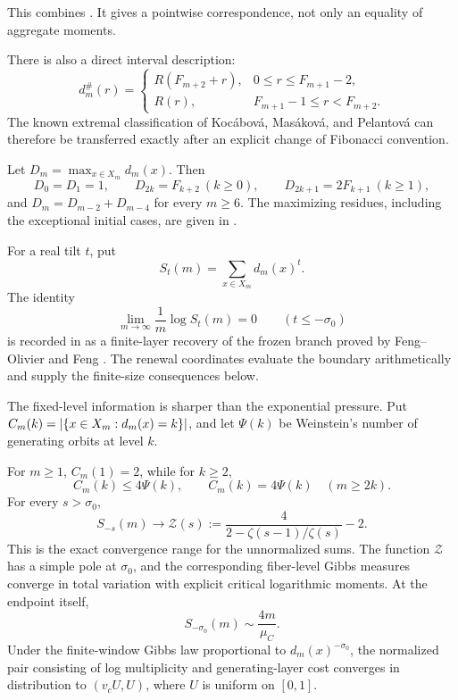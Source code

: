 This combines .  It gives a
pointwise correspondence, not only an equality of aggregate moments.

There is also a direct interval description:
\[
 d_m^\#(r)=
 \begin{cases}
 R(F_{m+2}+r),&0\le r\le F_{m+1}-2,\\
 R(r),&F_{m+1}-1\le r<F_{m+2}.
 \end{cases}
\]
The known extremal classification of Koc\'abov\'a, Mas\'akov\'a, and
Pelantov\'a can therefore be transferred exactly after an explicit change of
Fibonacci convention.

\begin{theoremD}
Let \(D_m=\max_{x\in X_m}d_m(x)\).  Then
\[
 D_0=D_1=1,\qquad D_{2k}=F_{k+2}\ (k\ge0),\qquad
 D_{2k+1}=2F_{k+1}\ (k\ge1),
\]
and \(D_m=D_{m-2}+D_{m-4}\) for every \(m\ge6\).  The maximizing residues,
including the exceptional initial cases, are given in
.
\end{theoremD}

For a real tilt \(t\), put
\[
  S_t(m)=\sum_{x\in X_m}d_m(x)^t.
\]
The identity
\[
  \lim_{m\to\infty}\frac1m\log S_t(m)=0
  \qquad(t\le-\sigma_0)
\]
is recorded in  as a finite-layer
recovery of the frozen branch proved by Feng--Olivier and Feng
\cite{FengOlivier2003,Feng2005}.  The renewal coordinates evaluate the
boundary arithmetically and supply the finite-size consequences below.

The fixed-level information is sharper than the exponential pressure.  Put
\(C_m(k)=\lvert \{x\in X_m:d_m(x)=k\} \rvert\), and let \(\Psi(k)\) be Weinstein's
number of generating orbits at level \(k\).

\begin{theoremE}
For \(m\ge1\), \(C_m(1)=2\), while for \(k\ge2\),
\[
 C_m(k)\le4\Psi(k),
 \qquad C_m(k)=4\Psi(k)\quad(m\ge2k).
\]
For every \(s>\sigma_0\),
\[
 S_{-s}(m)\longrightarrow
 \mathcal Z(s):=\frac4{2-\zeta(s-1)/\zeta(s)}-2.
\]
This is the exact convergence range for the unnormalized sums.  The function
\(\mathcal Z\) has a simple pole at \(\sigma_0\), and the corresponding
fiber-level Gibbs measures converge in total variation with explicit
critical logarithmic moments.
At the endpoint itself,
\[
 S_{-\sigma_0}(m)\sim\frac{4m}{\mu_C}.
\]
Under the finite-window Gibbs law proportional to
\(d_m(x)^{-\sigma_0}\), the normalized pair consisting of log multiplicity
and generating-layer cost converges in distribution to
\((v_cU,U)\), where \(U\) is uniform on \([0,1]\).
\end{theoremE}

